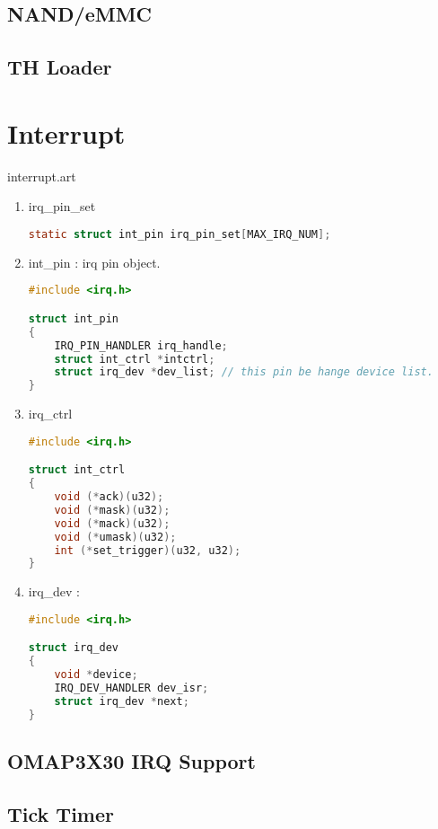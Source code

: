 \documentclass[a4paper,11pt]{book}
\begin{document}
\begin{CJK*}{UTF8}{gbsn}
\section{NAND/eMMC}

\section{TH Loader}

\chapter{Interrupt}
 {interrupt.art}

\begin{enumerate}
\item irq\_pin\_set
\begin{lstlisting}[language=c, numbers=none]
	static struct int_pin irq_pin_set[MAX_IRQ_NUM];
\end{lstlisting}

\item int\_pin : irq pin object.
\begin{lstlisting}[language=c, numbers=none]
#include <irq.h>

struct int_pin
{
	IRQ_PIN_HANDLER irq_handle;
	struct int_ctrl *intctrl;
	struct irq_dev *dev_list; // this pin be hange device list.
}
\end{lstlisting}

\item irq\_ctrl
\begin{lstlisting}[language=c, numbers=none]
#include <irq.h>

struct int_ctrl
{
	void (*ack)(u32);
	void (*mask)(u32);
	void (*mack)(u32);
	void (*umask)(u32);
	int (*set_trigger)(u32, u32);
}
\end{lstlisting}

\item irq\_dev :
\begin{lstlisting}[language=c, numbers=none]
#include <irq.h>

struct irq_dev
{
	void *device;
	IRQ_DEV_HANDLER dev_isr;
	struct irq_dev *next;
}
\end{lstlisting}
\end{enumerate}

\section{OMAP3X30 IRQ Support}

\section{Tick Timer}


\end{CJK*}
\end{document}
